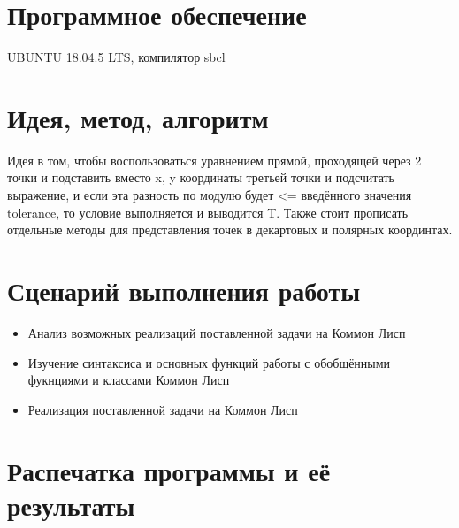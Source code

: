 \documentclass[12pt]{article}
\begin{document}
\section{Программное обеспечение}
UBUNTU 18.04.5 LTS, компилятор sbcl

\section{Идея, метод, алгоритм}

Идея в том, чтобы воспользоваться уравнением прямой, проходящей через 2 точки и подставить вместо x, y координаты третьей точки и подсчитать выражение, и если эта разность по модулю будет <= введённого значения tolerance, то условие выполняется и выводится T. Также стоит прописать отдельные методы для представления точек в декартовых и полярных координтах.

\section{Сценарий выполнения работы}
\begin{itemize}
\setlength{\itemsep}{-1mm}
\item Анализ возможных реализаций поставленной задачи на Коммон Лисп
\item Изучение синтаксиса и основных функций работы с обобщёнными фукнциями и классами Коммон Лисп
\item Реализация поставленной задачи на Коммон Лисп
\end{itemize}
\section{Распечатка программы и её результаты}
\end{document}
